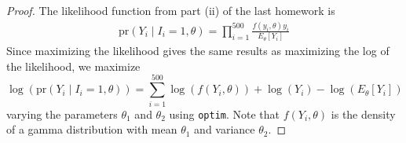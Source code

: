 \documentclass[letterpaper, 12pt]{article}\usepackage{graphicx, color}
\newcommand{\pr}{\text{pr}}
\newcommand{\sbs}{\;|\;} %
\begin{document}
\begin{enumerate}
\begin{enumerate}[(i)]
\begin{proof}
The likelihood function from part (ii) of the last homework is 
\begin{align}
\pr(Y_i \sbs I_i = 1, \theta) = \prod_{i=1}^{500} \frac{f(y_i, \theta) y_i}{E_\theta[Y_i]}
\end{align}
Since maximizing the likelihood gives the same results as maximizing the log of the likelihood, we maximize
\begin{equation}
\log(\pr(Y_i \sbs I_i = 1, \theta)) = \sum_{i=1}^{500} \log(f(Y_i, \theta)) + \log( Y_i) - \log(E_\theta[Y_i])
\end{equation}
varying the parameters $\theta_1$ and $\theta_2$ using \texttt{optim}. Note that $f(Y_i, \theta)$ is the density of a gamma distribution with mean $\theta_1$ and variance $\theta_2$.


\end{proof}
\end{enumerate}
\end{enumerate}
\end{document}
